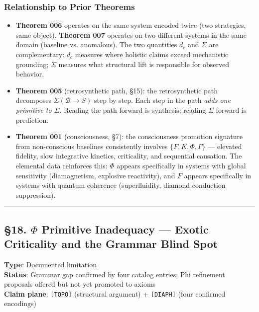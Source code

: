 \documentclass[12pt,a4paper]{article}
\newcommand{\pilcrow}{\S}
\begin{document}
\subsubsection{Relationship to Prior Theorems}

\begin{itemize}
    \item \textbf{Theorem 006} operates on the same system encoded twice (two strategies, same object). \textbf{Theorem 007} operates on two different systems in the same domain (baseline vs. anomalous). The two quantities $d_c$ and $\Sigma$ are complementary: $d_c$ measures where holistic claims exceed mechanistic grounding; $\Sigma$ measures what structural lift is responsible for observed behavior.
    \item \textbf{Theorem 005} (retrosynthetic path, \pilcrow{}15): the retrosynthetic path decomposes $\Sigma(\mathcal{B} \to S)$ step by step. Each step in the path \emph{adds one primitive to $\Sigma$}. Reading the path forward is synthesis; reading $\Sigma$ forward is prediction.
    \item \textbf{Theorem 001} (consciousness, \pilcrow{}7): the consciousness promotion signature from non-conscious baselines consistently involves $\{F, K, \Phi, \Gamma\}$ --- elevated fidelity, slow integrative kinetics, criticality, and sequential causation. The elemental data reinforces this: $\Phi$ appears specifically in systems with global sensitivity (diamagnetism, explosive reactivity), and $F$ appears specifically in systems with quantum coherence (superfluidity, diamond conduction suppression).
\end{itemize}

\begin{center}
\rule{0.5\textwidth}{0.4pt}
\end{center}

\subsection{\pilcrow{}18. $\Phi$ Primitive Inadequacy --- Exotic Criticality and the Grammar Blind Spot}

\textbf{Type}: Documented limitation   \\
\textbf{Status}: Grammar gap confirmed by four catalog entries; Phi refinement proposals offered but not yet promoted to axioms   \\
\textbf{Claim plane}: \texttt{{[}TOPO{]}} (structural argument) + \texttt{{[}DIAPH{]}} (four confirmed encodings)
\end{document}
